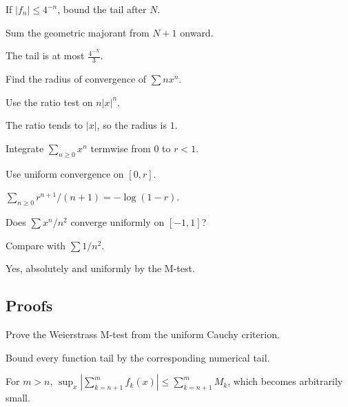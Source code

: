 \begin{exercise}\label{exr:ii13-expand-02}
If \(|f_n|\le4^{-n}\), bound the tail after \(N\).
\end{exercise}
\begin{hint}
Sum the geometric majorant from \(N+1\) onward.
\end{hint}
\begin{solution}
The tail is at most \(\frac{4^{-N}}{3}\).
\end{solution}

\begin{exercise}\label{exr:ii13-expand-03}
Find the radius of convergence of \(\sum n x^n\).
\end{exercise}
\begin{hint}
Use the ratio test on \(n|x|^n\).
\end{hint}
\begin{solution}
The ratio tends to \(|x|\), so the radius is \(1\).
\end{solution}

\begin{exercise}\label{exr:ii13-expand-04}
Integrate \(\sum_{n\ge0}x^n\) termwise from \(0\) to \(r<1\).
\end{exercise}
\begin{hint}
Use uniform convergence on \([0,r]\).
\end{hint}
\begin{solution}
\(\sum_{n\ge0}r^{n+1}/(n+1)=-\log(1-r)\).
\end{solution}

\begin{exercise}\label{exr:ii13-expand-05}
Does \(\sum x^n/n^2\) converge uniformly on \([-1,1]\)?
\end{exercise}
\begin{hint}
Compare with \(\sum1/n^2\).
\end{hint}
\begin{solution}
Yes, absolutely and uniformly by the M-test.
\end{solution}

\subsection*{Proofs}

\begin{exercise}\label{exr:ii13-expand-06}
Prove the Weierstrass M-test from the uniform Cauchy criterion.
\end{exercise}
\begin{hint}
Bound every function tail by the corresponding numerical tail.
\end{hint}
\begin{solution}
For \(m>n\), \(\sup_x|\sum_{k=n+1}^m f_k(x)|\le\sum_{k=n+1}^m M_k\), which becomes arbitrarily small.
\end{solution}

